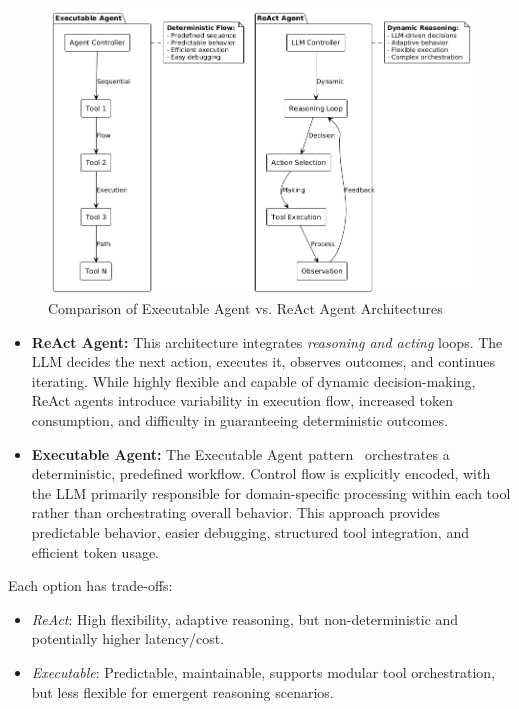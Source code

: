 \begin{spacing}{1.2}
\begin{figure}[H] 
    \centering 
    \includegraphics[scale=0.6]{images/agent_architecture_comparison.png} 
    \caption{Comparison of Executable Agent vs. ReAct Agent Architectures} 
    \label{fig:agent_comparison} 
\end{figure}

\begin{itemize}
    \item \textbf{ReAct Agent:} This architecture integrates \emph{reasoning and acting} loops. The LLM decides the next action, executes it, observes outcomes, and continues iterating. While highly flexible and capable of dynamic decision-making, ReAct agents introduce variability in execution flow, increased token consumption, and difficulty in guaranteeing deterministic outcomes.
    
    \item \textbf{Executable Agent:} The Executable Agent pattern~\cite{microsoftAgentPatterns} orchestrates a deterministic, predefined workflow. Control flow is explicitly encoded, with the LLM primarily responsible for domain-specific processing within each tool rather than orchestrating overall behavior. This approach provides predictable behavior, easier debugging, structured tool integration, and efficient token usage.
\end{itemize}

Each option has trade-offs:

\begin{itemize}
    \item \emph{ReAct}: High flexibility, adaptive reasoning, but non-deterministic and potentially higher latency/cost.
    \item \emph{Executable}: Predictable, maintainable, supports modular tool orchestration, but less flexible for emergent reasoning scenarios.
\end{itemize}


\end{spacing}
